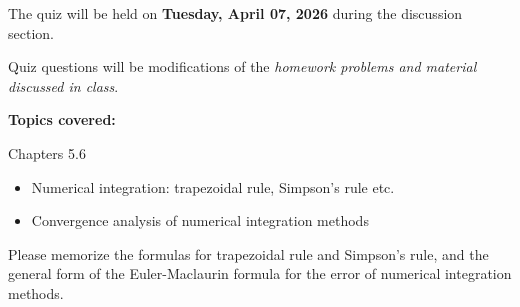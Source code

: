 \documentclass[reqno, answers]{exam}
\begin{document}
The quiz will be held on {\bf Tuesday, April 07, 2026} during the discussion section.

Quiz questions will be modifications of the {\it homework problems and material discussed in class}.

\textbf{Topics covered:}

Chapters 5.6

\begin{itemize}
    \item Numerical integration: trapezoidal rule, Simpson's rule etc.
    \item Convergence analysis of numerical integration methods
\end{itemize}

Please memorize the formulas for trapezoidal rule and Simpson's rule, and the general form of the Euler-Maclaurin formula for the error of numerical integration methods.
\end{document}
